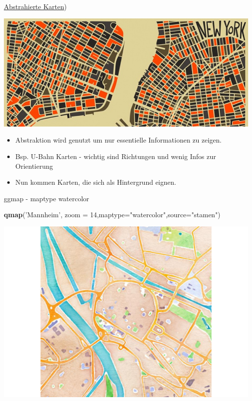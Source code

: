 \documentclass[ignorenonframetext,]{beamer}
\newenvironment{Shaded}{}{}
\newcommand{\KeywordTok}[1]{\textcolor[rgb]{0.00,0.44,0.13}{\textbf{{#1}}}}
\newcommand{\DataTypeTok}[1]{\textcolor[rgb]{0.56,0.13,0.00}{{#1}}}
\newcommand{\DecValTok}[1]{\textcolor[rgb]{0.25,0.63,0.44}{{#1}}}
\newcommand{\StringTok}[1]{\textcolor[rgb]{0.25,0.44,0.63}{{#1}}}
\newcommand{\NormalTok}[1]{{#1}}
\providecommand{\tightlist}{%
\setlength{\itemsep}{0pt}\setlength{\parskip}{0pt}}
\begin{document}
\begin{frame}{\href{http://www.designfaves.com/2014/03/abstracted-maps-reveal-cities-personalities}{Abstrahierte
Karten})}

\includegraphics{./tex2pdf.956/fe48d8ba47fef64a463668f151db18a4d3782b5a.jpg}

\begin{itemize}
\tightlist
\item
  Abstraktion wird genutzt um nur essentielle Informationen zu zeigen.
\item
  Bsp. U-Bahn Karten - wichtig sind Richtungen und wenig Infos zur
  Orientierung
\item
  Nun kommen Karten, die sich als Hintergrund eignen.
\end{itemize}

\end{frame}

\begin{frame}[fragile]{ggmap - maptype watercolor}

\begin{Shaded}
\begin{Highlighting}[]
\KeywordTok{qmap}\NormalTok{(}\StringTok{'Mannheim'}\NormalTok{, }\DataTypeTok{zoom =} \DecValTok{14}\NormalTok{,}\DataTypeTok{maptype=}\StringTok{"watercolor"}\NormalTok{,}\DataTypeTok{source=}\StringTok{"stamen"}\NormalTok{)}
\end{Highlighting}
\end{Shaded}

\includegraphics{R_intern_files/figure-beamer/unnamed-chunk-271-1.pdf}

\end{frame}
\end{document}
